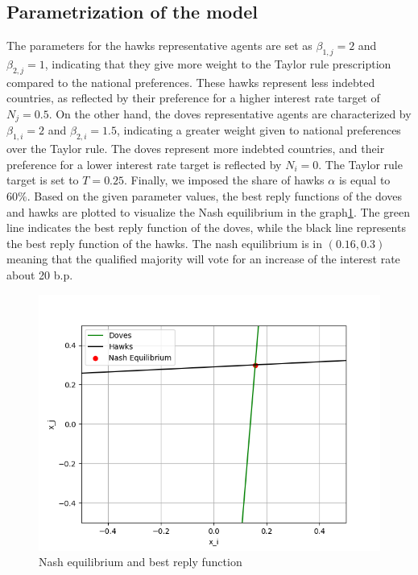 \documentclass[12pt]{article}
\begin{document}
\subsection{Parametrization of the model}
The parameters for the hawks representative agents are set as $\beta_{1,j} = 2$ and $\beta_{2,j} = 1$, indicating that
they give more weight to the Taylor rule prescription compared to the national preferences. These hawks represent less
indebted countries, as reflected by their preference for a higher interest rate target of $N_{j} = 0.5$. On the other
hand, the doves representative agents are characterized by $\beta_{1,i} = 2$ and $\beta_{2,i} = 1.5$, indicating a
greater weight given to national preferences over the Taylor rule. The doves represent more indebted countries, and
their preference for a lower interest rate target is reflected by $N_{i} = 0$. The Taylor rule target is set to $T =
0.25$. Finally, we imposed the share of hawks $\alpha$ is equal to $60\%$. 
Based on the given parameter values, the best
reply functions of the doves and hawks are plotted to visualize the Nash equilibrium in  the graph\ref{figure1}. 
The green line indicates the best 
reply function of the doves, while the black line represents the best reply function of the hawks.
The nash equilibrium is in $(0.16,0.3)$ meaning that the qualified majority will vote for an increase of the interest
rate  about 20 b.p.
\begin{figure}
    \centering
    \includegraphics[scale=0.8]{plot.png}
    \caption{Nash equilibrium and best reply function\label{figure1}}
\end{figure}
\end{document}
